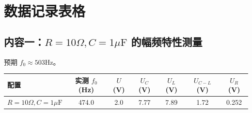 \documentclass{article}
\begin{document}
\newpage
\section{数据记录表格}

\subsection{内容一：$R=10\Omega, C=1\mu\text{F}$ 的幅频特性测量}
预期 $f_0 \approx 503\text{Hz}$。


\begin{table}[H]
\centering
\begin{tabular}{|l|c|c|c|c|c|c|}
\hline
配置 & 实测 $f_0$ (Hz) & $U$ (V) & $U_C$ (V) & $U_L$ (V) & $U_{C-L}$ (V) & $U_{R}$ (V) \\ \hline
$R=10\Omega, C=1\mu\text{F}$ & 474.0 & 2.0 & 7.77 & 7.89 & 1.72 & 0.252 \\ \hline
\end{tabular}
\end{table}

\renewcommand{\arraystretch}{1.5} 
\end{document}
